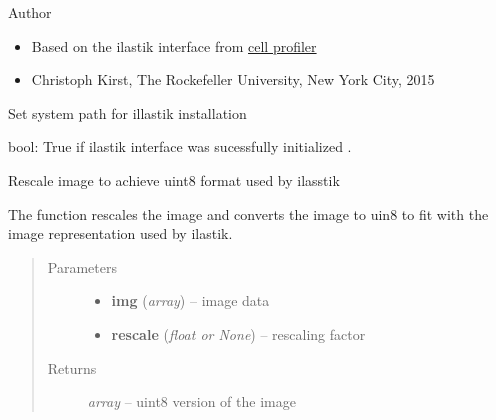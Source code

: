 \documentclass[letterpaper,10pt,english]{sphinxmanual}
\begin{document}
Author
\begin{itemize}
\item {} 
Based on the ilastik interface from \href{http://www.cellprofiler.org/}{cell profiler}

\item {} 
Christoph Kirst, The Rockefeller University, New York City, 2015

\end{itemize}

\begin{fulllineitems}
\label{api/ClearMap.ImageProcessing:ClearMap.ImageProcessing.IlastikClassification.initializeIlastik}
Set system path for illastik installation

\end{fulllineitems}


\begin{fulllineitems}
\label{api/ClearMap.ImageProcessing:ClearMap.ImageProcessing.IlastikClassification.Initialized}
bool: True if ilastik interface was sucessfully initialized .

\end{fulllineitems}


\begin{fulllineitems}
\label{api/ClearMap.ImageProcessing:ClearMap.ImageProcessing.IlastikClassification.rescaleToIlastik}
Rescale image to achieve uint8 format used by ilasstik

The function rescales the image and converts the image to uin8
to fit with the image representation used by ilastik.
\begin{quote}\begin{description}
\item[{Parameters}] \leavevmode\begin{itemize}
\item {} 
\textbf{img} (\emph{array}) --
image data

\item {} 
\textbf{rescale} (\emph{float or None}) --
rescaling factor

\end{itemize}

\item[{Returns}] \leavevmode
\emph{array} --
uint8 version of the image

\end{description}\end{quote}

\end{fulllineitems}
\end{document}
